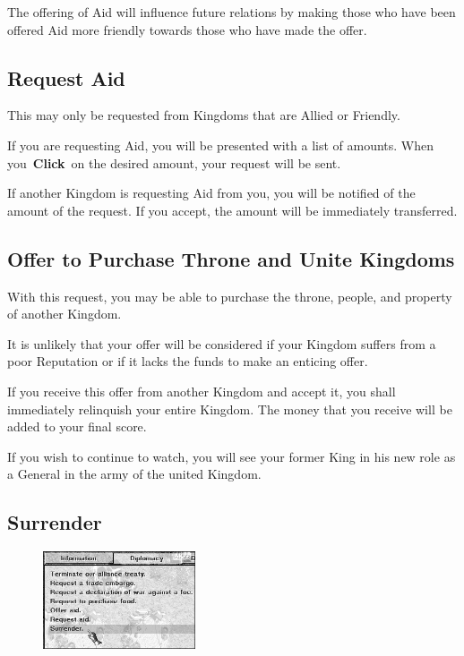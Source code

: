 The offering  of Aid will influence future relations by making those who have been offered Aid more friendly towards those who have made the offer.

\subsection{Request Aid}

This may only be requested from Kingdoms that are Allied or Friendly.

If you are requesting  Aid, you will be presented with a list of amounts. When you \textbf{Click} on the desired amount, your request will be sent.

If another Kingdom is requesting Aid from you, you will be notified of the amount of the request. If you accept, the amount will be immediately transferred.

\subsection{Offer to Purchase Throne and Unite Kingdoms}

With this request, you may be able to purchase the throne, people, and property of another Kingdom.

It is unlikely that your offer will be considered if your Kingdom suffers from a poor Reputation or if it lacks the funds to make an enticing offer.

If you receive this offer from another Kingdom and accept it, you shall immediately relinquish your entire Kingdom. The money that you receive will be added to your final score.

If you wish to continue to watch, you will see your former King in his new role as a General in the army of the united Kingdom.

\clearpage

\subsection{Surrender}

\begin{figure}
	\vspace{-20pt}
	\begin{center}
		\includegraphics[width=0.4\textwidth]{Idimplomacy_surrender}
	\end{center}
	\vspace{-20pt}
\end{figure}

